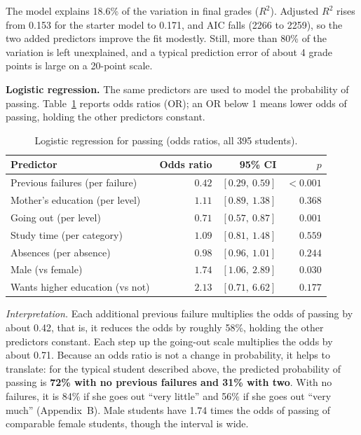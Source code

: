 \documentclass[11pt,a4paper]{article}
\begin{document}
The model explains 18.6\% of the variation in final grades ($R^2$). Adjusted $R^2$ rises from 0.153 for the starter model to 0.171, and AIC falls (2266 to 2259), so the two added predictors improve the fit modestly. Still, more than 80\% of the variation is left unexplained, and a typical prediction error of about 4 grade points is large on a 20-point scale.

\textbf{Logistic regression.} The same predictors are used to model the probability of passing. Table~\ref{tab:log} reports odds ratios (OR); an OR below 1 means lower odds of passing, holding the other predictors constant.

\begin{table}[H]
\centering\small
\caption{Logistic regression for passing (odds ratios, all 395 students).}
\label{tab:log}
\begin{tabular}{lrrr}
\toprule
Predictor & Odds ratio & 95\% CI & $p$ \\
\midrule
Previous failures (per failure) & $0.42$ & $[0.29,\ 0.59]$ & $<0.001$ \\
Mother's education (per level) & $1.11$ & $[0.89,\ 1.38]$ & $0.368$ \\
Going out (per level) & $0.71$ & $[0.57,\ 0.87]$ & $0.001$ \\
Study time (per category) & $1.09$ & $[0.81,\ 1.48]$ & $0.559$ \\
Absences (per absence) & $0.98$ & $[0.96,\ 1.01]$ & $0.244$ \\
Male (vs female) & $1.74$ & $[1.06,\ 2.89]$ & $0.030$ \\
Wants higher education (vs not) & $2.13$ & $[0.71,\ 6.62]$ & $0.177$ \\
\bottomrule
\end{tabular}
\end{table}

\emph{Interpretation.} Each additional previous failure multiplies the odds of passing by about 0.42, that is, it reduces the odds by roughly 58\%, holding the other predictors constant. Each step up the going-out scale multiplies the odds by about 0.71. Because an odds ratio is not a change in probability, it helps to translate: for the typical student described above, the predicted probability of passing is \textbf{72\% with no previous failures and 31\% with two}. With no failures, it is 84\% if she goes out ``very little'' and 56\% if she goes out ``very much'' (Appendix~B). Male students have 1.74 times the odds of passing of comparable female students, though the interval is wide.
\end{document}

